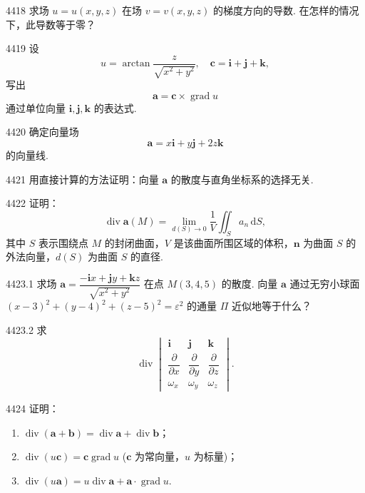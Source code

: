 \begin{prob}[M]{4418}
求场 $u = u(x, y, z)$ 在场 $v = v(x, y, z)$ 的梯度方向的导数. 在怎样的情况下，此导数等于零？
\end{prob}

\begin{prob}[M]{4419}
设
\[
u = \arctan \frac{z}{\sqrt{x^2 + y^2}}, \quad \boldsymbol{c} = \boldsymbol{i} + \boldsymbol{j} + \boldsymbol{k},
\]
写出
\[
\boldsymbol{a} = \boldsymbol{c} \times \operatorname{grad} u
\]
通过单位向量 $\boldsymbol{i}, \boldsymbol{j}, \boldsymbol{k}$ 的表达式.
\end{prob}

\begin{prob}[M]{4420}
确定向量场
\[
\boldsymbol{a} = x\boldsymbol{i} + y\boldsymbol{j} + 2z\boldsymbol{k}
\]
的向量线.
\end{prob}

\begin{prob}[M]{4421}
用直接计算的方法证明：向量 $\boldsymbol{a}$ 的散度与直角坐标系的选择无关.
\end{prob}

\begin{prob}[M]{4422}
证明：
\[
\operatorname{div} \boldsymbol{a}(M) = \lim_{d(S) \to 0} \frac{1}{V} \iint_S a_n \,\mathrm{d}S,
\]
其中 $S$ 表示围绕点 $M$ 的封闭曲面，$V$ 是该曲面所围区域的体积，$\boldsymbol{n}$ 为曲面 $S$ 的外法向量，$d(S)$ 为曲面 $S$ 的直径.
\end{prob}

\begin{prob}[M]{4423.1}
求场 $\boldsymbol{a} = \dfrac{-\boldsymbol{i}x + \boldsymbol{j}y + \boldsymbol{k}z}{\sqrt{x^2 + y^2}}$ 在点 $M(3, 4, 5)$ 的散度. 向量 $\boldsymbol{a}$ 通过无穷小球面 $(x - 3)^2 + (y - 4)^2 + (z - 5)^2 = \varepsilon^2$ 的通量 $\Pi$ 近似地等于什么？
\end{prob}

\begin{prob}[S]{4423.2}
求
\[
\operatorname{div} \begin{vmatrix}
\boldsymbol{i} & \boldsymbol{j} & \boldsymbol{k} \\
\dfrac{\partial}{\partial x} & \dfrac{\partial}{\partial y} & \dfrac{\partial}{\partial z} \\
\omega_x & \omega_y & \omega_z
\end{vmatrix}.
\]
\end{prob}

\begin{prob}[L]{4424}
证明：
\begin{enumerate}[label=(\alph*), itemsep=2pt, topsep=3pt]
  \item $\operatorname{div}(\boldsymbol{a} + \boldsymbol{b}) = \operatorname{div} \boldsymbol{a} + \operatorname{div} \boldsymbol{b}$；
  \item $\operatorname{div}(u\boldsymbol{c}) = \boldsymbol{c} \operatorname{grad} u$ ($\boldsymbol{c}$ 为常向量，$u$ 为标量)；
  \item $\operatorname{div}(u\boldsymbol{a}) = u \operatorname{div} \boldsymbol{a} + \boldsymbol{a} \cdot \operatorname{grad} u$.
\end{enumerate}
\end{prob}

